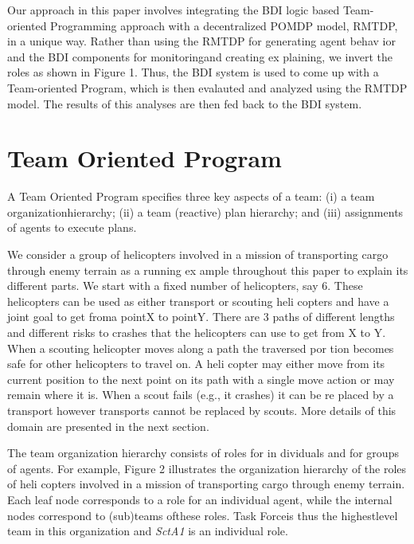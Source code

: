 \documentclass{IEEEtran}
\begin{document}
 Our approach in this paper involves integrating the BDI
logic based Team-oriented Programming approach with a
 decentralized POMDP model, RMTDP, in a unique way.
 Rather than using the RMTDP for generating agent behav
ior and the BDI components for monitoringand creating ex
plaining, we invert the roles as shown in Figure 1. Thus,
 the BDI system is used to come up with a Team-oriented
 Program, which is then evalauted and analyzed using the
 RMTDP model. The results of this analyses are then fed
 back to the BDI system.

\section{\bfseries{Team Oriented Program}}
A Team Oriented Program specifies three key aspects of a
 team: (i) a team organizationhierarchy; (ii) a team (reactive)
 plan hierarchy; and (iii) assignments of agents to execute
 plans.
 
 We consider a group of helicopters involved in a mission
 of transporting cargo through enemy terrain as a running ex
ample throughout this paper to explain its different parts.
 We start with a fixed number of helicopters, say 6. These
 helicopters can be used as either transport or scouting heli
copters and have a joint goal to get froma pointX to pointY.
 There are 3 paths of different lengths and different risks to
 crashes that the helicopters can use to get from X to Y. When
 a scouting helicopter moves along a path the traversed por
tion becomes safe for other helicopters to travel on. A heli
copter may either move from its current position to the next
 point on its path with a single move action or may remain
 where it is. When a scout fails (e.g., it crashes) it can be re
placed by a transport however transports cannot be replaced
 by scouts. More details of this domain are presented in the
 next section.

 The team organization hierarchy consists of roles for in
dividuals and for groups of agents. For example, Figure
 2 illustrates the organization hierarchy of the roles of heli
copters involved in a mission of transporting cargo through
 enemy terrain. Each leaf node corresponds to a role for
 an individual agent, while the internal nodes correspond to
 (sub)teams ofthese roles. Task Forceis thus the highestlevel
 team in this organization and {\itshape SctA1} is an individual role.
\end{document}
